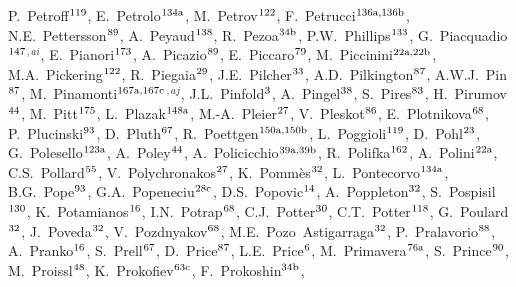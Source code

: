 \begin{flushleft}
P.~Petroff$^\textrm{\scriptsize 119}$,
E.~Petrolo$^\textrm{\scriptsize 134a}$,
M.~Petrov$^\textrm{\scriptsize 122}$,
F.~Petrucci$^\textrm{\scriptsize 136a,136b}$,
N.E.~Pettersson$^\textrm{\scriptsize 89}$,
A.~Peyaud$^\textrm{\scriptsize 138}$,
R.~Pezoa$^\textrm{\scriptsize 34b}$,
P.W.~Phillips$^\textrm{\scriptsize 133}$,
G.~Piacquadio$^\textrm{\scriptsize 147}$$^{,ai}$,
E.~Pianori$^\textrm{\scriptsize 173}$,
A.~Picazio$^\textrm{\scriptsize 89}$,
E.~Piccaro$^\textrm{\scriptsize 79}$,
M.~Piccinini$^\textrm{\scriptsize 22a,22b}$,
M.A.~Pickering$^\textrm{\scriptsize 122}$,
R.~Piegaia$^\textrm{\scriptsize 29}$,
J.E.~Pilcher$^\textrm{\scriptsize 33}$,
A.D.~Pilkington$^\textrm{\scriptsize 87}$,
A.W.J.~Pin$^\textrm{\scriptsize 87}$,
M.~Pinamonti$^\textrm{\scriptsize 167a,167c}$$^{,aj}$,
J.L.~Pinfold$^\textrm{\scriptsize 3}$,
A.~Pingel$^\textrm{\scriptsize 38}$,
S.~Pires$^\textrm{\scriptsize 83}$,
H.~Pirumov$^\textrm{\scriptsize 44}$,
M.~Pitt$^\textrm{\scriptsize 175}$,
L.~Plazak$^\textrm{\scriptsize 148a}$,
M.-A.~Pleier$^\textrm{\scriptsize 27}$,
V.~Pleskot$^\textrm{\scriptsize 86}$,
E.~Plotnikova$^\textrm{\scriptsize 68}$,
P.~Plucinski$^\textrm{\scriptsize 93}$,
D.~Pluth$^\textrm{\scriptsize 67}$,
R.~Poettgen$^\textrm{\scriptsize 150a,150b}$,
L.~Poggioli$^\textrm{\scriptsize 119}$,
D.~Pohl$^\textrm{\scriptsize 23}$,
G.~Polesello$^\textrm{\scriptsize 123a}$,
A.~Poley$^\textrm{\scriptsize 44}$,
A.~Policicchio$^\textrm{\scriptsize 39a,39b}$,
R.~Polifka$^\textrm{\scriptsize 162}$,
A.~Polini$^\textrm{\scriptsize 22a}$,
C.S.~Pollard$^\textrm{\scriptsize 55}$,
V.~Polychronakos$^\textrm{\scriptsize 27}$,
K.~Pomm\`es$^\textrm{\scriptsize 32}$,
L.~Pontecorvo$^\textrm{\scriptsize 134a}$,
B.G.~Pope$^\textrm{\scriptsize 93}$,
G.A.~Popeneciu$^\textrm{\scriptsize 28c}$,
D.S.~Popovic$^\textrm{\scriptsize 14}$,
A.~Poppleton$^\textrm{\scriptsize 32}$,
S.~Pospisil$^\textrm{\scriptsize 130}$,
K.~Potamianos$^\textrm{\scriptsize 16}$,
I.N.~Potrap$^\textrm{\scriptsize 68}$,
C.J.~Potter$^\textrm{\scriptsize 30}$,
C.T.~Potter$^\textrm{\scriptsize 118}$,
G.~Poulard$^\textrm{\scriptsize 32}$,
J.~Poveda$^\textrm{\scriptsize 32}$,
V.~Pozdnyakov$^\textrm{\scriptsize 68}$,
M.E.~Pozo~Astigarraga$^\textrm{\scriptsize 32}$,
P.~Pralavorio$^\textrm{\scriptsize 88}$,
A.~Pranko$^\textrm{\scriptsize 16}$,
S.~Prell$^\textrm{\scriptsize 67}$,
D.~Price$^\textrm{\scriptsize 87}$,
L.E.~Price$^\textrm{\scriptsize 6}$,
M.~Primavera$^\textrm{\scriptsize 76a}$,
S.~Prince$^\textrm{\scriptsize 90}$,
M.~Proissl$^\textrm{\scriptsize 48}$,
K.~Prokofiev$^\textrm{\scriptsize 63c}$,
F.~Prokoshin$^\textrm{\scriptsize 34b}$,

\end{flushleft}
